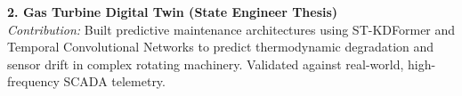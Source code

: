 \documentclass[11pt, a4paper]{article}
\begin{document}
\vspace{0.2cm}

\textbf{2. Gas Turbine Digital Twin (State Engineer Thesis)} \\
\textit{Contribution:} Built predictive maintenance architectures using ST-KDFormer and Temporal Convolutional Networks to predict thermodynamic degradation and sensor drift in complex rotating machinery. Validated against real-world, high-frequency SCADA telemetry.
\end{document}
